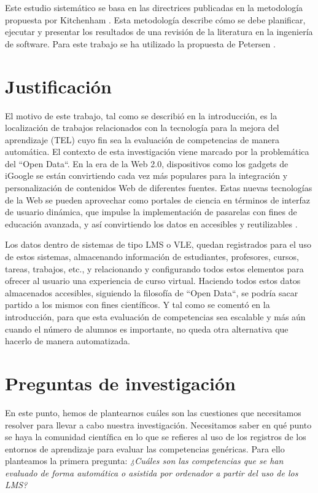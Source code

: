 
Este estudio sistemático se basa en las directrices publicadas en la metodología propuesta por Kitchenham \cite{Kitchenham:2010}. Esta metodología describe cómo se debe planificar, ejecutar y presentar los resultados de una revisión de la literatura en la ingeniería de software. Para este trabajo se ha utilizado la propuesta de Petersen \cite{Petersen:2008}.

\section{Justificación}
El motivo de este trabajo, tal como se describió en la introducción, es la localización de trabajos relacionados con la tecnología para la mejora del aprendizaje (TEL) cuyo fin sea la evaluación de competencias de manera automática. El contexto de esta investigación viene marcado por la problemática del ``Open Data``. En la era de la Web 2.0, dispositivos como los gadgets de iGoogle se están convirtiendo cada vez más populares para la integración y personalización de contenidos Web de diferentes fuentes. Estas nuevas tecnologías de la Web se pueden aprovechar como portales de ciencia en términos de interfaz de usuario dinámica, que impulse la implementación de pasarelas con fines de educación avanzada, y así convirtiendo los datos en accesibles y reutilizables \cite{Wenjun:2008}.

Los datos dentro de sistemas de tipo LMS o VLE, quedan registrados para el uso de estos sistemas, almacenando información de estudiantes, profesores, cursos, tareas, trabajos, etc., y relacionando y configurando todos estos elementos para ofrecer al usuario una experiencia de curso virtual. Haciendo todos estos datos almacenados accesibles, siguiendo la filosofía de ``Open Data``, se podría sacar partido a los mismos con fines científicos. Y tal como se comentó en la introducción, para que esta evaluación de competencias sea escalable y más aún cuando el número de alumnos es importante, no queda otra alternativa que hacerlo de manera automatizada.


\section{Preguntas de investigación}

En este punto, hemos de plantearnos cuáles son las cuestiones que necesitamos resolver para llevar a cabo nuestra investigación. Necesitamos saber en qué punto se haya la comunidad científica en lo que se refieres al uso de los registros de los entornos de aprendizaje para evaluar las competencias genéricas. Para ello planteamos la primera pregunta: \emph{¿Cuáles son las competencias que se han evaluado de forma automática o asistida por ordenador a partir del uso de los LMS?}

